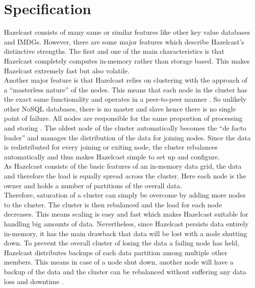 \section{Specification}
Hazelcast consists of many same or similar features like other key value databases and IMDGs. However, there are some major features which describe Hazelcast’s distinctive strengths.
The first and one of the main characteristics is that Hazelcast completely computes in-memory rather than storage based.  This makes Hazelcast extremely fast but also volatile.\\
Another major feature is that Hazelcast relies on clustering with the approach of a “masterless nature” of the nodes. This means that each node in the cluster has the exact same functionality and operates in a peer-to-peer manner \cite{johns2015}. So unlikely other NoSQL databases, there is no master and slave hence there is no single point of failure. All nodes are responsible for the same proportion of processing and storing \cite{hazelcastmanual}. The oldest node of the cluster automatically becomes the “de facto leader” and manages the distribution of the data for joining nodes. Since the data is redistributed for every joining or exiting node, the cluster rebalances automatically and thus makes Hazelcast simple to set up and configure. \\
As Hazelcast consists of the basic features of an in-memory data grid, the data and therefore the load is equally spread across the cluster. Here each node is the owner and holds a number of partitions of the overall data. \\
Therefore, saturation of a cluster can simply be overcome by adding more nodes to the cluster. The cluster is then rebalanced and the load for each node decreases. This means scaling is easy and fast which makes Hazelcast suitable for handling big amounts of data.
Nevertheless, since Hazelcast persists data entirely in-memory, it has the main drawback that data will be lost with a node shutting down. To prevent the overall cluster of losing the data a failing node has held, Hazelcast distributes backups of each data partition among multiple other members. This means in case of a node shut down, another node will have a backup of the data and the cluster can be rebalanced without suffering any data loss and downtime \cite{johns2015} .
